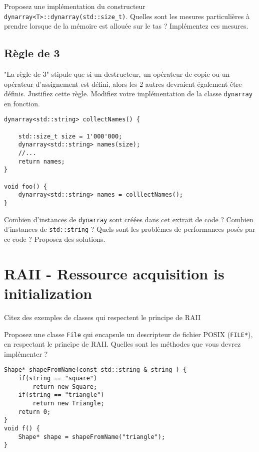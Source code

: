\documentclass[9pt]{article}
\begin{document}
\qn
Proposez une implémentation du constructeur \lstinline{dynarray<T>::dynarray(std::size_t)}.
Quelles sont les mesures particulières à prendre lorsque de la mémoire est allouée sur le tas ? Implémentez ces mesures.

\vspace{5cm}
\subsection*{Règle de 3}

\qn
"La règle de 3" stipule que si un destructeur, un opérateur de copie ou un opérateur d'assignement est défini, alors les 2 autres devraient également être définis.
Justifiez cette règle.
Modifiez votre implémentation de la classe \lstinline{dynarray} en fonction.

\newpage
\qn

\begin{lstlisting}
dynarray<std::string> collectNames() {
	
	std::size_t size = 1'000'000;
	dynarray<std::string> names(size);
	//...
	return names;
}

void foo() {
	dynarray<std::string> names = colllectNames();
}
\end{lstlisting}


Combien d'instances de \lstinline{dynarray} sont créées dans cet extrait de code ? Combien d'instances de
\lstinline{std::string} ?
Quels sont les problèmes de performances posés par ce code ? Proposez des solutions. 

\vspace{1cm}


\section{RAII - Ressource acquisition is initialization}

\qn
Citez des exemples de classes qui respectent le principe de RAII

\vspace{1cm}
\qn
Proposez une classe \lstinline{File} qui encapsule un descripteur de fichier POSIX (\lstinline{FILE*}), en respectant le principe de RAII. Quelles sont les méthodes que vous devrez implémenter ?

\qn
\begin{lstlisting}
Shape* shapeFromName(const std::string & string ) {
	if(string == "square")
		return new Square;
	if(string == "triangle")
		return new Triangle;
	return 0;
}
void f() {
	Shape* shape = shapeFromName("triangle");
}
\end{lstlisting}
\end{document}
